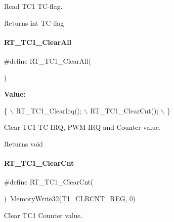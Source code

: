 Read T\+C1 T\+C-\/flag. 

\begin{DoxyReturn}{Returns}
int T\+C-\/flag 
\end{DoxyReturn}
\mbox{\label{a00080_a2a7757de241add69f5fffc4e1dfa431a}} 
\paragraph{\texorpdfstring{R\+T\+\_\+\+T\+C1\+\_\+\+Clear\+All}{RT\_TC1\_ClearAll}}
{\footnotesize\ttfamily \#define R\+T\+\_\+\+T\+C1\+\_\+\+Clear\+All(\begin{DoxyParamCaption}{ }\end{DoxyParamCaption})}

{\bfseries Value\+:}
\begin{DoxyCode}
\{                   \(\backslash\)
        RT\_TC1\_ClearIrq(); \(\backslash\)
        RT\_TC1\_ClearCnt(); \(\backslash\)
    \}
\end{DoxyCode}


Clear T\+C1 T\+C-\/\+I\+RQ, P\+W\+M-\/\+I\+RQ and Counter value. 

\begin{DoxyReturn}{Returns}
void 
\end{DoxyReturn}
\mbox{\label{a00080_abcd4f7c1a53b5d0a31f45076725a1ed6}} 
\paragraph{\texorpdfstring{R\+T\+\_\+\+T\+C1\+\_\+\+Clear\+Cnt}{RT\_TC1\_ClearCnt}}
{\footnotesize\ttfamily \#define R\+T\+\_\+\+T\+C1\+\_\+\+Clear\+Cnt(\begin{DoxyParamCaption}{ }\end{DoxyParamCaption})~\mbox{\hyperlink{a00026_a6b9732365b12e48ddb89fe1028b975b0}{Memory\+Write32}}(\mbox{\hyperlink{a00026_abb2cbf74aac1b5551218b38332137dd9}{T1\+\_\+\+C\+L\+R\+C\+N\+T\+\_\+\+R\+EG}}, 0)}



Clear T\+C1 Counter value. 

